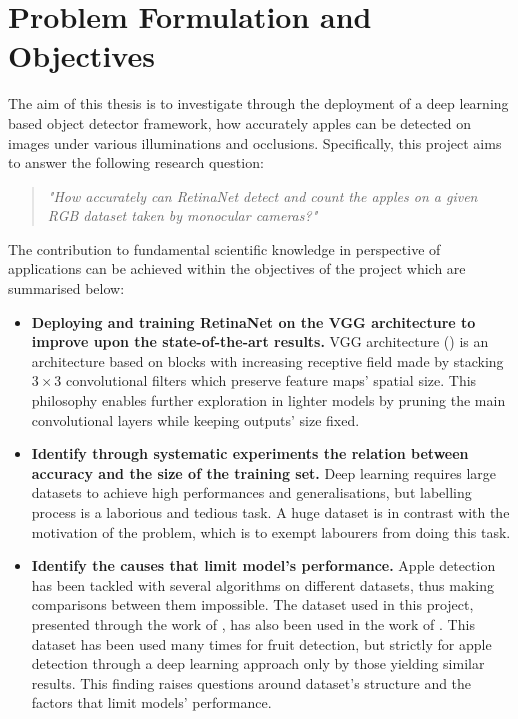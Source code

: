 \section{Problem Formulation and Objectives}
The aim of this thesis is to investigate through the deployment of a deep learning based object detector framework, how accurately apples can be detected on images under various illuminations and occlusions. Specifically, this project aims to answer the following research question:

\begin{quote}
\centering 
\textit{"How accurately can RetinaNet detect and count the apples on a given RGB dataset taken by monocular cameras?"}
\end{quote}

The contribution to fundamental scientific knowledge in perspective of applications can be achieved within the objectives of the project which are summarised below:

\begin{itemize}
\item \textbf{Deploying and training RetinaNet on the VGG architecture to improve upon the state-of-the-art results.} VGG architecture (\cite{simonyan2014very}) is an architecture based on blocks with increasing receptive field made by stacking $3\times3$ convolutional filters which preserve feature maps' spatial size. This philosophy enables further exploration in lighter models by pruning the main convolutional layers while keeping outputs' size fixed.  
\item \textbf{Identify through systematic experiments the relation between accuracy and the size of the training set.} Deep learning requires large datasets to achieve high performances and generalisations, but labelling process is a laborious and tedious task. A huge dataset is in contrast with the motivation of the problem, which is to exempt labourers from doing this task.
\item \textbf{Identify the causes that limit model's performance.} Apple detection has been tackled with several algorithms on different datasets, thus making comparisons between them impossible. The dataset used in this project, presented through the work of \cite{bargoti2017deep}, has also been used in the work of \cite{liang2018apple}. This dataset has been used many times for fruit detection, but strictly for apple detection through a deep learning approach only by those yielding similar results. This finding raises questions around dataset's structure and the factors that limit models' performance.

\end{itemize}

